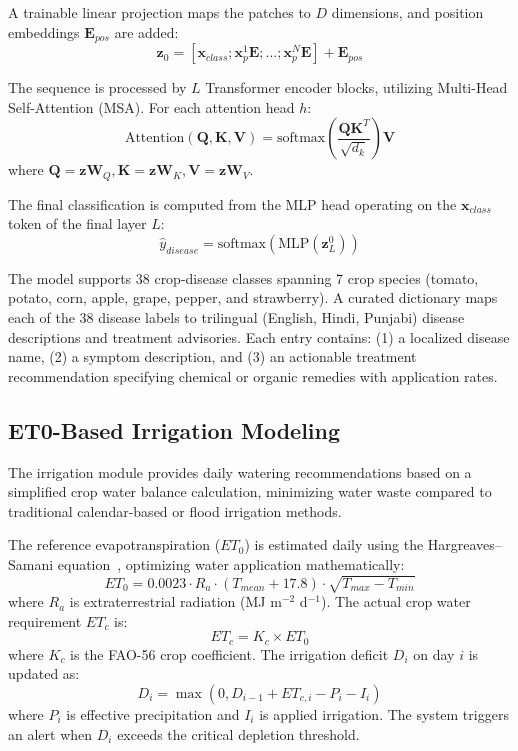 \documentclass[conference]{IEEEtran}
\begin{document}
A trainable linear projection maps the patches to $D$ dimensions, and position embeddings $\mathbf{E}_{pos}$ are added:
\begin{equation}
\mathbf{z}_0 = [\mathbf{x}_{class}; \mathbf{x}_{p}^1 \mathbf{E}; \dots; \mathbf{x}_{p}^N \mathbf{E}] + \mathbf{E}_{pos}
\end{equation}

The sequence is processed by $L$ Transformer encoder blocks, utilizing Multi-Head Self-Attention (MSA). For each attention head $h$:
\begin{equation}
\text{Attention}(\mathbf{Q}, \mathbf{K}, \mathbf{V}) = \text{softmax}\left(\frac{\mathbf{Q}\mathbf{K}^T}{\sqrt{d_k}}\right)\mathbf{V}
\end{equation}
where $\mathbf{Q} = \mathbf{z} \mathbf{W}_Q, \mathbf{K} = \mathbf{z} \mathbf{W}_K, \mathbf{V} = \mathbf{z} \mathbf{W}_V$.

The final classification is computed from the MLP head operating on the $\mathbf{x}_{class}$ token of the final layer $L$:
\begin{equation}
\hat{y}_{disease} = \text{softmax}(\text{MLP}(\mathbf{z}_L^0))
\end{equation}

The model supports 38 crop-disease classes spanning 7 crop species (tomato, potato, corn, apple, grape, pepper, and strawberry). A curated dictionary maps each of the 38 disease labels to trilingual (English, Hindi, Punjabi) disease descriptions and treatment advisories. Each entry contains: (1) a localized disease name, (2) a symptom description, and (3) an actionable treatment recommendation specifying chemical or organic remedies with application rates.

\subsection{ET0-Based Irrigation Modeling}

The irrigation module provides daily watering recommendations based on a simplified crop water balance calculation, minimizing water waste compared to traditional calendar-based or flood irrigation methods.

The reference evapotranspiration ($ET_0$) is estimated daily using the Hargreaves--Samani equation~\cite{b22}, optimizing water application mathematically:
\begin{equation}
ET_0 = 0.0023 \cdot R_a \cdot (T_{mean} + 17.8) \cdot \sqrt{T_{max} - T_{min}}
\end{equation}
where $R_a$ is extraterrestrial radiation (MJ m$^{-2}$ d$^{-1}$). The actual crop water requirement $ET_c$ is:
\begin{equation}
ET_c = K_c \times ET_0
\end{equation}
where $K_c$ is the FAO-56 crop coefficient. The irrigation deficit $D_i$ on day $i$ is updated as:
\begin{equation}
D_i = \max(0, D_{i-1} + ET_{c,i} - P_i - I_i)
\end{equation}
where $P_i$ is effective precipitation and $I_i$ is applied irrigation. The system triggers an alert when $D_i$ exceeds the critical depletion threshold.
\end{document}
